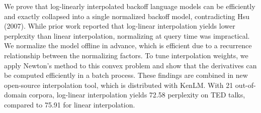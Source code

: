 We prove that log-linearly interpolated backoff language models can be efficiently and exactly collapsed into a single normalized backoff model, contradicting Hsu (2007).  While prior work reported that log-linear interpolation yields lower perplexity than linear interpolation, normalizing at query time was impractical.  We normalize the model offline in advance, which is efficient due to a recurrence relationship between the normalizing factors. To tune interpolation weights, we apply Newton's method to this convex problem and show that the derivatives can be computed efficiently in a batch process. These findings are combined in new open-source interpolation tool, which is distributed with KenLM.  With 21 out-of-domain corpora, log-linear interpolation yields 72.58 perplexity on TED talks, compared to 75.91 for linear interpolation.
